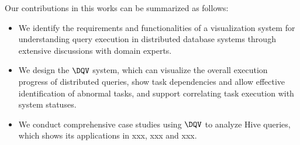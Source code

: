 Our contributions in this works can be summarized as follows:
\begin{itemize}
	\item We identify the requirements and functionalities of a visualization system for understanding query execution in distributed database systems through extensive discussions with domain experts.   
	\item We design the $\DQV$ system, which can visualize the overall execution progress of distributed queries, show task dependencies and allow effective identification of abnormal tasks, and support correlating task execution with system statuses.
	\item We conduct comprehensive case studies using $\DQV$ to analyze Hive queries, which shows its applications in xxx, xxx and xxx.
\end{itemize}


